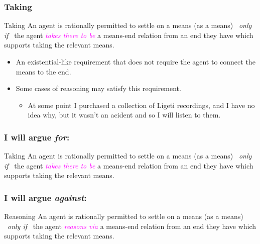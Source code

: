 \documentclass[noamssymb, compress, handout]{beamer} %
\begin{document}
  \begin{frame}
    \frametitle{Taking}

  \begin{block}{Taking}
    An agent is rationally permitted to settle on a means (as a means)
    \newline
    \mbox{ }\hfill\emph{only if}\hfill\mbox{ }
    \newline
    the agent \textcolor{fuchsia}{\emph{takes there to be}} a means-end relation from an end they have which supports taking the relevant means.
  \end{block}

  \begin{itemize}
  \item An existential-like requirement that does not require the agent to connect the means to the end.
  \item Some cases of reasoning may satisfy this requirement.
    \begin{itemize}
    \item At some point I purchased a collection of Ligeti recordings, and I have no idea why, but it wasn't an acident and so I will listen to them.
    \end{itemize}
  \end{itemize}
\end{frame}

\begin{frame}
  \frametitle{I will argue \emph{for}:}

  \begin{block}{Taking}
    An agent is rationally permitted to settle on a means (as a means)
    \newline
    \mbox{ }\hfill\emph{only if}\hfill\mbox{ }
    \newline
    the agent \textcolor{fuchsia}{\emph{takes there to be}} a means-end relation from an end they have which supports taking the relevant means.
  \end{block}
\end{frame}


\begin{frame}
  \frametitle{I will argue \emph{against}:}

  \begin{block}{Reasoning}
    An agent is rationally permitted to settle on a means (as a means)
    \newline
    \mbox{ }\hfill\emph{only if}\hfill\mbox{ }
    \newline
    the agent \textcolor{fuchsia}{\emph{reasons via}} a means-end relation from an end they have which supports taking the relevant means.
  \end{block}
\end{frame}
\end{document}
